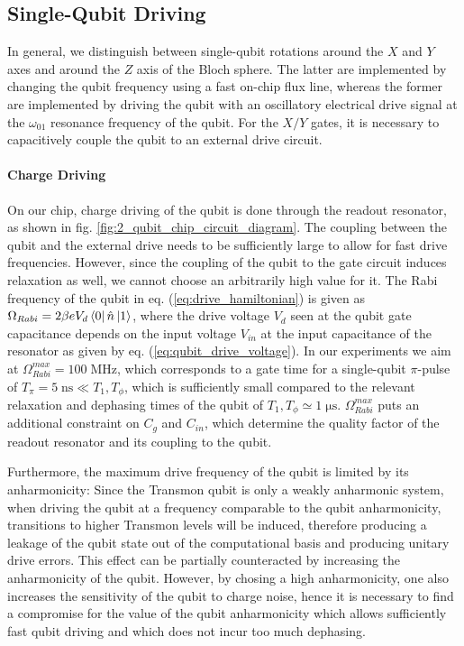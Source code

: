 \subsection{Single-Qubit Driving}

In general, we distinguish between single-qubit rotations around the $X$ and $Y$ axes and around the $Z$ axis of the Bloch sphere. The latter are implemented by changing the qubit frequency using a fast on-chip flux line, whereas the former are implemented by driving the qubit with an oscillatory electrical drive signal at the $\omega_{01}$ resonance frequency of the qubit. For the $X/Y$ gates, it is necessary to capacitively couple the qubit to an external drive circuit. 

\paragraph{Charge Driving}

On our chip, charge driving of the qubit is done through the readout resonator, as shown in fig. \ref{fig:2_qubit_chip_circuit_diagram}. The coupling between the qubit and the external drive needs to be sufficiently large to allow for fast drive frequencies. However, since the coupling of the qubit to the gate circuit induces relaxation as well, we cannot choose an arbitrarily high value for it. The Rabi frequency of the qubit in eq. (\ref{eq:drive_hamiltonian}) is given as $\Omega_{Rabi}= 2 \beta e V_d \left< 0 \right|\hat{n}\left| 1 \right>$, where the drive voltage $V_d$ seen at the qubit gate capacitance depends on the input voltage $V_{in}$ at the input capacitance of the resonator as given by eq. (\ref{eq:qubit_drive_voltage}). In our experiments we aim at $\Omega_{Rabi}^{max}=100\;\mathrm{MHz}$, which corresponds to a gate time for a single-qubit $\pi$-pulse of $T_\pi=5\;\mathrm{ns}\ll T_1,T_\phi$, which is sufficiently small compared to the relevant relaxation and dephasing times of the qubit of $T_1,T_\phi\simeq 1\;\mathrm{\mu s}$. $\Omega_{Rabi}^{max}$ puts an additional constraint on $C_{g}$ and $C_{in}$, which determine the quality factor of the readout resonator and its coupling to the qubit.

\smallskip	

Furthermore, the maximum drive frequency of the qubit is limited by its anharmonicity: Since the Transmon qubit is only a weakly anharmonic system, when driving the qubit at a frequency comparable to the qubit anharmonicity, transitions to higher Transmon levels will be induced, therefore producing a leakage of the qubit state out of the computational basis and producing unitary drive errors. This effect can be partially counteracted by increasing the anharmonicity of the qubit. However, by chosing a high anharmonicity, one also increases the sensitivity of the qubit to charge noise, hence it is necessary to find a compromise for the value of the qubit anharmonicity which allows sufficiently fast qubit driving and which does not incur too much dephasing.


